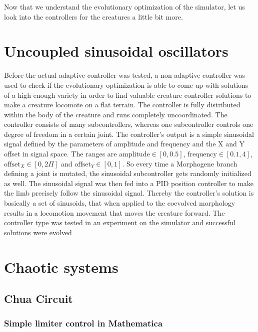 \documentclass[main]{subfiles}
\begin{document}
Now that we understand the evolutionary optimization of the simulator, let us look into the controllers for the creatures a little bit more. 

\section{Uncoupled sinusoidal oscillators}

Before the actual adaptive controller was tested, a non-adaptive controller was used to check if the evolutionary optimization is able to come up with solutions of a high enough variety in order to find valuable creature controller solutions to make a creature locomote on a flat terrain. The controller is fully distributed within the body of the creature and runs completely uncoordinated. The controller consists of many subcontrollers, whereas one subcontroller controls one degree of freedom in a certain joint. The controller's output is a simple sinusoidal signal defined by the parameters of amplitude and frequency and the X and Y offset in signal space. The ranges are $\text{amplitude} \in [0,0.5]$, $\text{frequency} \in [0.1,4]$, $\text{offset}_X \in [0,2\Pi]$ and $\text{offset}_Y \in [0,1]$. So every time a Morphogene branch defining a joint is mutated, the sinusoidal subcontroller gets randomly initialized as well. The sinusoidal signal was then fed into a PID position controller to make the limb precisely follow the sinusoidal signal. Thereby the controller's solution is basically a set of sinusoids, that when applied to the coevolved morphology results in a locomotion movement that moves the creature forward. The controller type was tested in an experiment on the simulator and successful solutions were evolved

\section{Chaotic systems}

\lipsum[2]

\subsection{Chua Circuit}

\lipsum[3]

\subsubsection{Simple limiter control in Mathematica}

\lipsum[4]

\end{document}
